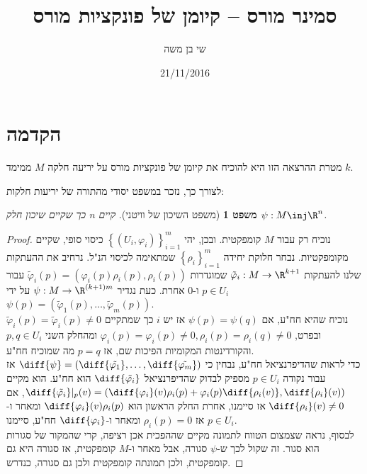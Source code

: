 \documentclass{article}
\title{סמינר מורס – קיומן של פונקציות מורס}
\author{שי בן משה}
\date{21/11/2016}
\newtheorem*{theorem*}{משפט}
\theoremstyle{definition}
\begin{document}
	\maketitle
	
	
	
	
	\section{הקדמה}
	
	מטרת ההרצאה הזו היא להוכיח את קיומן של פונקציות מורס על יריעה חלקה \(M\) ממימד \(k\).
	
	לצורך כך, נזכר במשפט יסודי מהתורה של יריעות חלקות:
	\begin{theorem*}[משפט השיכון של וויטני]
		קיים \(n\) כך שקיים שיכון חלק
		\(\psi: M \inj \R^n\).
	\end{theorem*}
	\begin{proof}
		נוכיח רק עבור \(M\) קומפקטית.
		ובכן, יהי
		\(\left\{\left(U_i,\varphi_i\right)\right\}_{i=1}^m\)
		כיסוי סופי, שקיים מקומפקטיות.
		נבחר חלוקת יחידה
		\(\left\{\rho_i\right\}_{i=1}^m\)
		שמתאימה לכיסוי הנ"ל.
		נרחיב את ההעתקות שלנו להעתקות
		\(\tilde{\varphi}_i: M \to \R^{k+1}\)
		שמוגדרות
		\(\tilde{\varphi}_i(p) = \left(\varphi_i(p)\rho_i(p),\rho_i(p)\right)\)
		עבור
		\(p \in U_i\)
		ו-\(0\) אחרת.
		כעת נגדיר
		\(\psi: M \to \R^{(k+1)m}\)
		על ידי
		\(
			\psi(p)=\left(\tilde{\varphi}_1(p),\dotsc,\tilde{\varphi}_m(p)\right)
		\).
		\\
		נוכיח שהיא חח"ע, אם
		\(\psi(p)=\psi(q)\)
		אז יש \(i\) כך שמתקיים
		\(\tilde{\varphi}_i(p)=\tilde{\varphi}_i(p)\neq 0\)
		ובפרט,
		\(\varphi_i(p)=\varphi_i(p)\neq 0,\rho_i(p)=\rho_i(q)\neq 0\)
		ומהחלק השני
		\(p,q \in U_i\)
		והקורדינטות המקומיות הפיכות שם, אז
		\(p=q\)
		מה שמוכיח חח"ע.
		\\
		כדי לראות שהדיפרנציאל חח"ע, נבחין כי
		\(\diff{\psi}=\left(\diff{\tilde{\varphi_1}},\dotsc,\diff{\tilde{\varphi_m}}\right)\)
		אז עבור נקודה
		\(p\in U_i\)
		מספיק לבדוק שהדיפרנציאל
		\(\diff{\tilde{\varphi_i}}\)
		הוא חח"ע.
		הוא מקיים
		\(
			\diff{\tilde{\varphi_i}}|_p(v)
			=\left(
				\diff{\varphi_i}(v)\rho_i(p) + \varphi_i(p)\diff{\rho_i(v)},
				\diff{\rho_i}(v)
			\right)
		\),
		אם
		\(\diff{\rho_i}(v)\neq 0\)
		אז סיימנו, אחרת החלק הראשון הוא
		\(\diff{\varphi_i}(v)\rho_i(p)\)
		ומאחר ו-\(p\in U_i\) אז
		\(\rho_i(p)=0\)
		ומאחר ו-\(\diff{\varphi_i}\) חח"ע, סיימנו.
		\\
		לבסוף, נראה שצמצום הטווח לתמונה מקיים שההפכית אכן רציפה,
		קרי שהמקור של סגורות הוא סגור.
		זה שקול לכך ש-\(\psi\) סגורה,
		אבל מאחר ו-\(M\) קומפקטית, אז סגורה היא גם קומפקטית,
		ולכן תמונתה קומפקטית ולכן גם סגורה, כנדרש.
	\end{proof}
	
\end{document}
